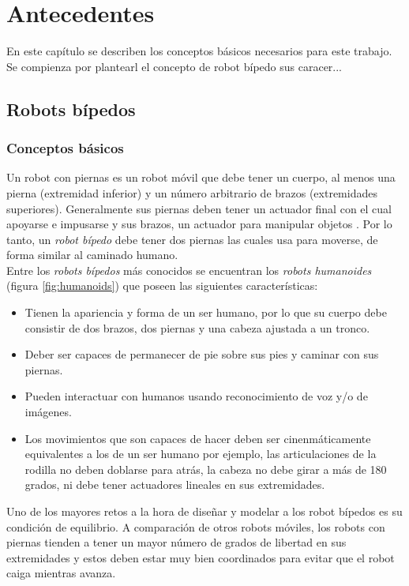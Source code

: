 \chapter{Antecedentes}

En este capítulo se describen los conceptos básicos necesarios para este trabajo. Se compienza por plantearl el concepto de robot bípedo sus caracer...

	\section{Robots bípedos}
		\subsection*{Conceptos básicos}
Un robot con piernas es un robot móvil que debe tener un cuerpo, al menos una pierna (extremidad inferior) y un número arbitrario de brazos (extremidades superiores). Generalmente sus piernas deben tener un actuador final con el cual apoyarse e impusarse  y sus brazos, un actuador para manipular objetos \citep{siciliano2016springer}. Por lo tanto, un \textit{robot bípedo} debe tener dos piernas las cuales usa para moverse, de forma similar al caminado humano.
\\

Entre los \textit{robots bípedos} más conocidos se encuentran los \textit{robots humanoides} (figura \ref{fig:humanoids}) que poseen las siguientes características:

\begin{itemize}
\item Tienen la apariencia y forma de un ser humano, por lo que su cuerpo debe consistir de dos brazos, dos piernas y una cabeza ajustada a un tronco.
\item Deber ser capaces de permanecer de pie sobre sus pies y caminar con sus piernas.
\item Pueden interactuar con humanos usando reconocimiento de voz y/o de imágenes.
\item Los movimientos que son capaces de hacer deben ser cinenmáticamente equivalentes a los de un ser humano por ejemplo, las articulaciones de la rodilla no deben doblarse para atrás, la cabeza no debe girar a más de 180 grados, ni debe tener actuadores lineales en sus extremidades.
\end{itemize}

Uno de los mayores retos a la hora de diseñar y modelar a los robot bípedos es su condición de equilibrio. A comparación de otros robots móviles, los robots con piernas tienden a tener un mayor número de grados de libertad en sus extremidades y estos deben estar muy bien coordinados para evitar que el  robot caiga mientras avanza.
\\
